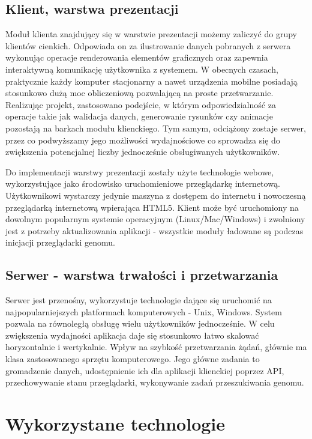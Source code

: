 \subsection*{Klient, warstwa prezentacji}
Moduł klienta znajdujący się w warstwie prezentacji możemy zaliczyć do grupy klientów cienkich.
Odpowiada on za ilustrowanie danych pobranych z serwera wykonując operacje renderowania elementów graficznych oraz zapewnia interaktywną komunikację użytkownika z systemem.
W obecnych czasach, praktycznie każdy komputer stacjonarny a nawet urządzenia mobilne posiadają stosunkowo dużą moc obliczeniową pozwalającą na proste przetwarzanie.
Realizując projekt, zastosowano podejście, w którym odpowiedzialność za operacje takie jak walidacja danych, generowanie rysunków czy animacje pozostają na barkach modułu klienckiego. 
Tym samym, odciążony zostaje serwer, przez co podwyższamy jego możliwości wydajnościowe co sprowadza się do zwiększenia potencjalnej liczby jednocześnie obsługiwanych użytkowników.

Do implementacji warstwy prezentacji zostały użyte technologie webowe, wykorzystujące jako środowisko uruchomieniowe przeglądarkę internetową. Użytkownikowi wystarczy jedynie maszyna z dostępem do internetu i nowoczesną przeglądarką internetową wpierająca HTML5. 
Klient może być uruchomiony na dowolnym popularnym systemie operacyjnym \mbox{(Linux/Mac/Windows)} i zwolniony jest z potrzeby aktualizowania aplikacji - wszystkie moduły ładowane są podczas inicjacji przeglądarki genomu.

\subsection*{Serwer - warstwa trwałości i przetwarzania}
Serwer jest przenośny, wykorzystuje technologie dające się uruchomić na najpopularniejszych platformach komputerowych - Unix, Windows.
System pozwala na równoległą obsługę wielu użytkowników jednocześnie.
W celu zwiększenia wydajności aplikacja daje się stosunkowo łatwo skalować horyzontalnie i wertykalnie.
Wpływ na szybkość przetwarzania żądań, głównie ma klasa zastosowanego sprzętu komputerowego.
Jego główne zadania to gromadzenie danych, udostępnienie ich dla aplikacji klienckiej poprzez API, przechowywanie stanu przeglądarki, wykonywanie zadań przeszukiwania genomu.

\section{Wykorzystane technologie}

